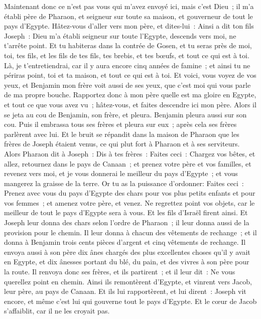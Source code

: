 \begin{multicols}{2}
Maintenant donc ce n'est pas vous qui m'avez envoyé ici, mais c'est Dieu~; il m'a établi père de Pharaon, et seigneur sur toute sa maison, et gouverneur de tout le pays d'Egypte.
Hâtez-vous d'aller vers mon père, et dites-lui~: Ainsi a dit ton fils Joseph~: Dieu m'a établi seigneur sur toute l'Egypte, descends vers moi, ne t'arrête point.
Et tu habiteras dans la contrée de Gosen, et tu seras près de moi, toi, tes fils, et les fils de tes fils, tes brebis, et tes bœufs, et tout ce qui est à toi.
Là, je t'entretiendrai, car il y aura encore cinq années de famine~; et ainsi tu ne périras point, toi et ta maison, et tout ce qui est à toi.
Et voici, vous voyez de vos yeux, et Benjamin mon frère voit aussi de ses yeux, que c'est moi qui vous parle de ma propre bouche.
Rapportez donc à mon père quelle est ma gloire en Egypte, et tout ce que vous avez vu~; hâtez-vous, et faites descendre ici mon père.
Alors il se jeta au cou de Benjamin, son frère, et pleura. Benjamin pleura aussi sur son cou.
Puis il embrassa tous ses frères et pleura sur eux~; après cela ses frères parlèrent avec lui.
Et le bruit se répandit dans la maison de Pharaon que les frères de Joseph étaient venus, ce qui plut fort à Pharaon et à ses serviteurs.
Alors Pharaon dit à Joseph~: Dis à tes frères~: Faites ceci~: Chargez vos bêtes, et allez, retournez dans le pays de Canaan~;
et prenez votre père et vos familles, et revenez vers moi, et je vous donnerai le meilleur du pays d'Egypte~; et vous mangerez la graisse de la terre.
Or tu as la puissance d'ordonner: Faites ceci~: Prenez avec vous du pays d'Egypte des chars pour vos plus petits enfants et pour vos femmes~; et amenez votre père, et venez.
Ne regrettez point vos objets, car le meilleur de tout le pays d'Egypte sera à vous.
Et les fils d'Israël firent ainsi. Et Joseph leur donna des chars selon l'ordre de Pharaon~; il leur donna aussi de la provision pour le chemin.
Il leur donna à chacun des vêtements de rechange~; et il donna à Benjamin trois cents pièces d'argent et cinq vêtements de rechange.
Il envoya aussi à son père dix ânes chargés des plus excellentes choses qu'il y avait en Egypte, et dix ânesses portant du blé, du pain, et des vivres à son père pour la route.
Il renvoya donc ses frères, et ils partirent~; et il leur dit~: Ne vous querellez point en chemin.
Ainsi ils remontèrent d'Egypte, et vinrent vers Jacob, leur père, au pays de Canaan.
Et ils lui rapportèrent, et lui dirent~: Joseph vit encore, et même c'est lui qui gouverne tout le pays d'Egypte. Et le cœur de Jacob s'affaiblit, car il ne les croyait pas.

\end{multicols}
